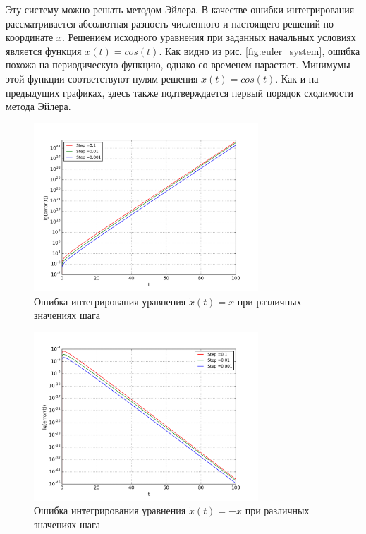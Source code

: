 \documentclass[a4paper]{article}
\begin{document}
Эту систему можно решать методом Эйлера. В качестве ошибки интегрирования рассматривается
абсолютная разность численного и настоящего решений по координате \(x\). Решением
исходного уравнения при заданных начальных условиях является функция \(x(t)=cos(t)\). Как видно
из рис. \ref{fig:euler_system}, ошибка похожа на периодическую функцию, однако со временем
нарастает. Минимумы этой функции соответствуют нулям решения \(x(t)=cos(t)\). Как и на
предыдущих графиках, здесь также подтверждается первый порядок сходимости метода
Эйлера.

\begin{figure}[H]
	\center
	\includegraphics[width=0.75\textwidth]{../pictures/lab3_exp_plus.png}
	\caption{Ошибка интегрирования уравнения \(\dot x(t) = x\) при различных значениях шага}
	\label{fig:euler_exp_plus}
\end{figure}

\begin{figure}[H]
	\center
	\includegraphics[width=0.75\textwidth]{../pictures/lab3_exp_minus.png}
	\caption{Ошибка интегрирования уравнения \(\dot x(t) = -x\) при различных значениях шага}
	\label{fig:euler_exp_minus}
\end{figure}
\end{document}
